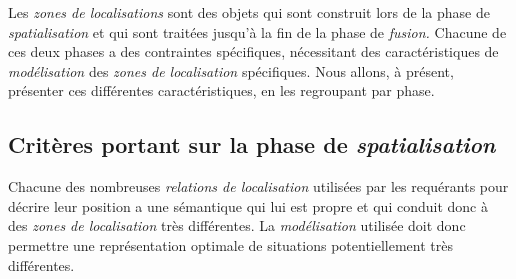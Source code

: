 Les \emph{zones de localisations} sont des objets qui sont construit
lors de la phase de \emph{spatialisation} et qui sont traitées jusqu'à
la fin de la phase de \emph{fusion.} Chacune de ces deux phases a des
contraintes spécifiques, nécessitant des caractéristiques de
\emph{modélisation} des \emph{zones de localisation} spécifiques.
Nous allons, à présent, présenter ces différentes caractéristiques, en
les regroupant par phase.

\subsection{Critères portant sur la phase de \emph{spatialisation}}

Chacune des nombreuses \emph{relations de localisation} utilisées par
les requérants pour décrire leur position a une sémantique qui lui est
propre et qui conduit donc à des \emph{zones de localisation} très
différentes. La \emph{modélisation} utilisée doit donc permettre une
représentation optimale de situations potentiellement très
différentes.

